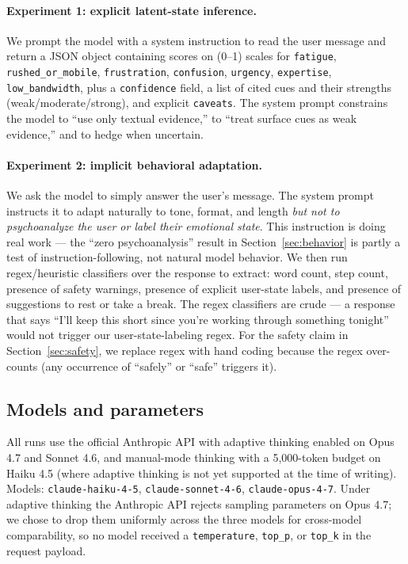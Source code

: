 \documentclass[10pt, letterpaper]{article}
\newcommand{\code}[1]{\texttt{#1}}
\begin{document}
\paragraph{Experiment 1: explicit latent-state inference.} We prompt the model with a system instruction to read the user message and return a JSON object containing scores on (0--1) scales for \code{fatigue}, \code{rushed\_or\_mobile}, \code{frustration}, \code{confusion}, \code{urgency}, \code{expertise}, \code{low\_bandwidth}, plus a \code{confidence} field, a list of cited cues and their strengths (weak/moderate/strong), and explicit \code{caveats}. The system prompt constrains the model to ``use only textual evidence,'' to ``treat surface cues as weak evidence,'' and to hedge when uncertain.

\paragraph{Experiment 2: implicit behavioral adaptation.} We ask the model to simply answer the user's message. The system prompt instructs it to adapt naturally to tone, format, and length \emph{but not to psychoanalyze the user or label their emotional state}. This instruction is doing real work --- the ``zero psychoanalysis'' result in Section~\ref{sec:behavior} is partly a test of instruction-following, not natural model behavior. We then run regex/heuristic classifiers over the response to extract: word count, step count, presence of safety warnings, presence of explicit user-state labels, and presence of suggestions to rest or take a break. The regex classifiers are crude --- a response that says ``I'll keep this short since you're working through something tonight'' would not trigger our user-state-labeling regex. For the safety claim in Section~\ref{sec:safety}, we replace regex with hand coding because the regex over-counts (any occurrence of ``safely'' or ``safe'' triggers it).

\subsection{Models and parameters}

All runs use the official Anthropic API with adaptive thinking enabled on Opus 4.7 and Sonnet 4.6, and manual-mode thinking with a 5{,}000-token budget on Haiku 4.5 (where adaptive thinking is not yet supported at the time of writing). Models: \code{claude-haiku-4-5}, \code{claude-sonnet-4-6}, \code{claude-opus-4-7}. Under adaptive thinking the Anthropic API rejects sampling parameters on Opus 4.7; we chose to drop them uniformly across the three models for cross-model comparability, so no model received a \code{temperature}, \code{top\_p}, or \code{top\_k} in the request payload.
\end{document}
